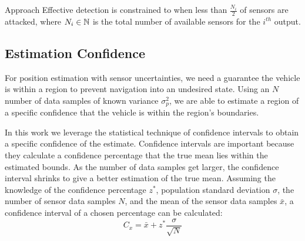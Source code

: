 \begin{section}{Approach}
Effective detection is constrained to when less than $\frac{N_i}{2}$ of sensors are attacked, where $N_i \in \mathbb{N}$ is the total number of available sensors for the $i^{th}$ output.



\subsection{Estimation Confidence}
For position estimation with sensor uncertainties, we need a guarantee the vehicle is within a region to prevent navigation into an undesired state. Using an $N$ number of data samples of known variance $\sigma_p^2$, we are able to estimate a region of a specific confidence that the vehicle is within the region's boundaries. %

In this work we leverage the statistical technique of confidence intervals to obtain a specific confidence of the estimate. Confidence intervals are important because they calculate a confidence percentage that the true mean lies within the estimated bounds. As the number of data samples get larger, the confidence interval shrinks to give a better estimation of the true mean. Assuming the knowledge of the confidence percentage $z^{*}$, population standard deviation $\sigma$, the number of sensor data samples $N$, and the mean of the sensor data samples $ \bar{x} $, a confidence interval of a chosen percentage can be calculated:
    \begin{equation}
     \label{Confidence_interval}
		C_x = \bar{x} + z^{*}\frac{\sigma}{\sqrt{N}}
	\end{equation}



\end{section}
